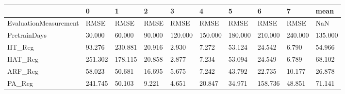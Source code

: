 \begin{tabular}{llllllllll}
\toprule
{} &       0 &       1 &      2 &       3 &       4 &       5 &       6 &       7 &    mean \\
\midrule
EvaluationMeasurement &    RMSE &    RMSE &   RMSE &    RMSE &    RMSE &    RMSE &    RMSE &    RMSE &     NaN \\
PretrainDays          &  30.000 &  60.000 & 90.000 & 120.000 & 150.000 & 180.000 & 210.000 & 240.000 & 135.000 \\
HT\_Reg                &  93.276 & 230.881 & 20.916 &   2.930 &   7.272 &  53.124 &  24.542 &   6.790 &  54.966 \\
HAT\_Reg               & 251.302 & 178.115 & 20.858 &   2.877 &   7.234 &  53.094 &  24.549 &   6.789 &  68.102 \\
ARF\_Reg               &  58.023 &  50.681 & 16.695 &   5.675 &   7.242 &  43.792 &  22.735 &  10.177 &  26.878 \\
PA\_Reg                & 241.745 &  50.103 &  9.221 &   4.651 &  20.847 &  34.971 & 158.736 &  48.851 &  71.141 \\
\bottomrule
\end{tabular}
